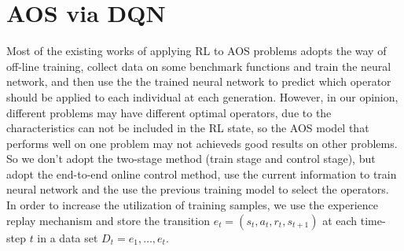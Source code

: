 \documentclass[journal]{IEEEtran}
\begin{document}
\section{AOS via DQN}
Most of the existing works of applying RL to AOS problems adopts the way of off-line training, collect data on some benchmark functions and train the neural network, and then use the the trained neural network to predict which operator should be applied to each individual at each generation.
% 
However, in our opinion, different problems may have different optimal operators, due to the characteristics can not be included in the RL state, so the AOS model that performs well on one problem may not achieveds good results on other problems.
So we don't adopt the two-stage method (train stage and control stage), but adopt the end-to-end online control method, use the current information to train neural network and the use the previous training model to select the operators.
In order to increase the utilization of training samples, we use the experience replay mechanism \cite{zha2019experience} and store the transition $e_t = (s_t,a_t,r_t,s_{t+1})$ at each time-step $t$ in a data set $D_t = {e_1,\dots, e_t}$.

\end{document}
